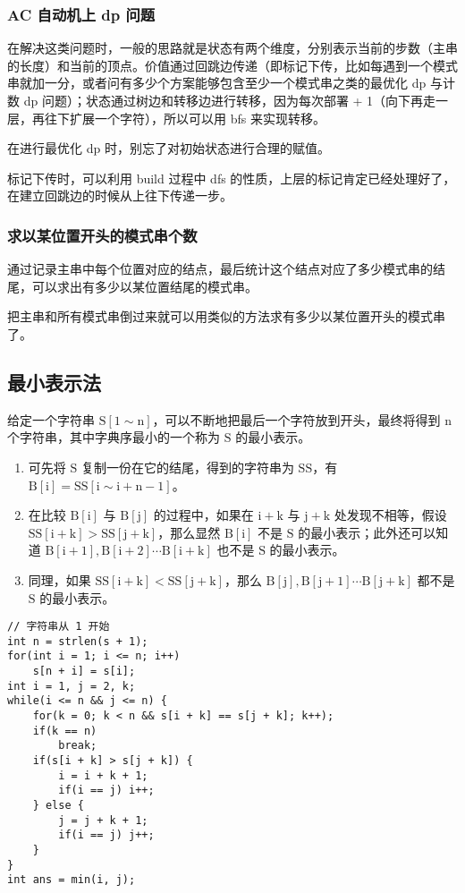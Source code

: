 \documentclass[UTF8]{article}
\begin{document}
\subsubsection{AC 自动机上 dp 问题}
在解决这类问题时，一般的思路就是状态有两个维度，分别表示当前的步数（主串的长度）和当前的顶点。价值通过回跳边传递（即标记下传，比如每遇到一个模式串就加一分，或者问有多少个方案能够包含至少一个模式串之类的最优化 dp 与计数 dp 问题）；状态通过树边和转移边进行转移，因为每次部署 + 1（向下再走一层，再往下扩展一个字符），所以可以用 bfs 来实现转移。

在进行最优化 dp 时，别忘了对初始状态进行合理的赋值。

标记下传时，可以利用 build 过程中 dfs 的性质，上层的标记肯定已经处理好了，在建立回跳边的时候从上往下传递一步。

\subsubsection{求以某位置开头的模式串个数}
通过记录主串中每个位置对应的结点，最后统计这个结点对应了多少模式串的结尾，可以求出有多少以某位置结尾的模式串。

把主串和所有模式串倒过来就可以用类似的方法求有多少以某位置开头的模式串了。


\subsection{最小表示法}
给定一个字符串 $\mathrm{S[1 \sim n]}$，可以不断地把最后一个字符放到开头，最终将得到 $\mathrm{n}$ 个字符串，其中字典序最小的一个称为  $\mathrm{S}$ 的最小表示。

\begin{enumerate}
	\item 可先将 $\mathrm{S}$ 复制一份在它的结尾，得到的字符串为 $\mathrm{SS}$，有 $\mathrm{B[i] = SS[i \sim i + n - 1]}$。		
	\item 在比较 $\mathrm{B[i]}$ 与 $\mathrm{B[j]}$ 的过程中，如果在 $\mathrm{i+k}$ 与 $\mathrm{j+k}$ 处发现不相等，假设 $\mathrm{SS[i+k] > SS[j+k]}$，那么显然 $\mathrm{B[i]}$ 不是 $\mathrm{S}$ 的最小表示；此外还可以知道 $\mathrm{B[i+1], B[i+2] \cdots B[i + k]}$ 也不是 $\mathrm{S}$ 的最小表示。
	\item 同理，如果 $\mathrm{SS[i+k] < SS[j + k]}$，那么 $\mathrm{B[j], B[j + 1] \cdots B[j+k]}$ 都不是 $\mathrm{S}$ 的最小表示。
\end{enumerate}

\begin{lstlisting}[caption=最小表示法]
// 字符串从 1 开始
int n = strlen(s + 1);
for(int i = 1; i <= n; i++)
	s[n + i] = s[i];
int i = 1, j = 2, k;
while(i <= n && j <= n) {
	for(k = 0; k < n && s[i + k] == s[j + k]; k++);
	if(k == n)
		break;
	if(s[i + k] > s[j + k]) {
		i = i + k + 1;
		if(i == j) i++;
	} else {
		j = j + k + 1;
		if(i == j) j++;
	}
}
int ans = min(i, j);
\end{lstlisting}
\end{document}
